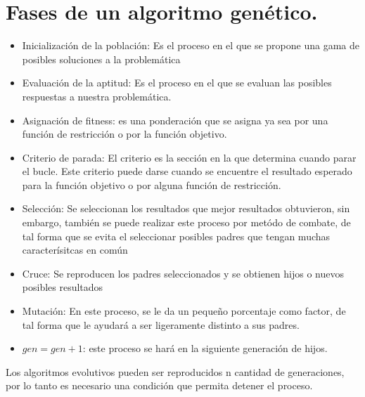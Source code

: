 \documentclass{article}
\begin{document}
    \section{Fases de un algoritmo genético.}
    \begin{itemize}
        \item Inicialización de la población: Es el proceso en el que se propone una gama de posibles soluciones a la problemática
        \item Evaluación de la aptitud: Es el proceso en el que se evaluan las posibles respuestas a nuestra problemática.
        \item Asignación de fitness: es una ponderación que se asigna ya sea por una función de restricción o por la función objetivo.
        \item Criterio de parada: El criterio es la sección en la que determina cuando parar el bucle. Este criterio puede darse cuando se encuentre el resultado esperado para la función objetivo o por alguna función de restricción.
        \item Selección: Se seleccionan los resultados que mejor resultados obtuvieron, sin embargo, también se puede realizar este proceso por metódo de combate, de tal forma que se evita el seleccionar posibles padres que tengan muchas caracterísitcas en común
        \item Cruce: Se reproducen los padres seleccionados y se obtienen hijos o nuevos posibles resultados
        \item Mutación: En este proceso, se le da un pequeño porcentaje como factor, de tal forma que le ayudará a ser ligeramente distinto a sus padres.
        \item $gen=gen+1$: este proceso se hará en la siguiente generación de hijos.
    \end{itemize}
    Los algoritmos evolutivos pueden ser reproducidos n cantidad de generaciones, por lo tanto es necesario una condición que permita detener el proceso.\citep{kubat2021introduction}
\end{document}
